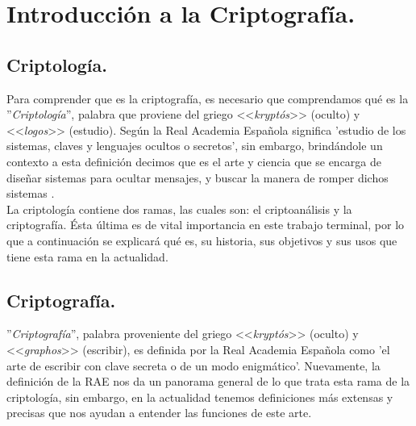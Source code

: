 \documentclass[12pt, a4paper, titlepage]{report}
\begin{document}
	    \section{Introducción a la Criptografía.}
	        \subsection{Criptología.}
	            Para comprender que es la criptografía, es necesario que comprendamos qué es la ''\textit{Criptología}'', palabra que proviene del griego <<\textit{kryptós}>> (oculto) y <<\textit{logos}>> (estudio). Según la Real Academia Española significa 'estudio de los sistemas, claves y lenguajes ocultos o secretos', sin embargo, brindándole un contexto a esta definición decimos que es el arte y ciencia que se encarga de diseñar sistemas para ocultar mensajes, y buscar la manera de romper dichos sistemas \cite{refCriptology}.\\
	            La criptología contiene dos ramas, las cuales son: el criptoanálisis y la criptografía. Ésta última es de vital importancia en este trabajo terminal, por lo que a continuación se explicará qué es, su historia, sus objetivos y sus usos que tiene esta rama en la actualidad.
            \subsection{Criptografía.}
                ''\textit{Criptografía}'', palabra proveniente del griego <<\textit{kryptós}>> (oculto) y <<\textit{graphos}>> (escribir), es definida por la Real Academia Española como 'el arte de escribir con clave secreta o de un modo enigmático'. Nuevamente, la definición de la RAE nos da un panorama general de lo que trata esta rama de la criptología, sin embargo, en la actualidad tenemos definiciones más extensas y precisas que nos ayudan a entender las funciones de este arte.\\
                
\end{document}
